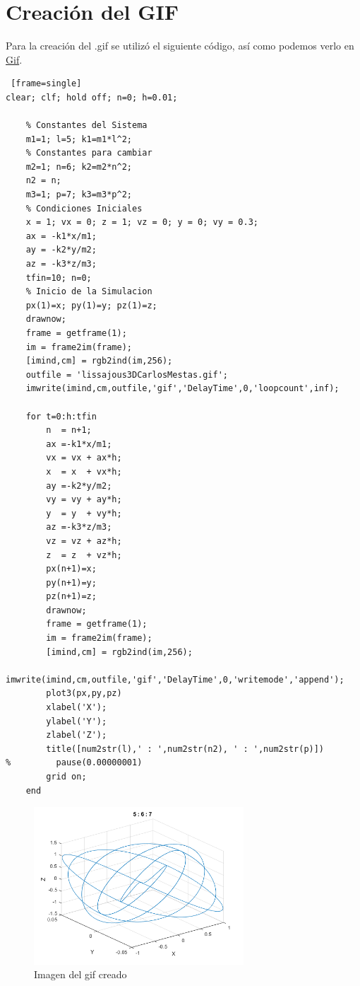 \documentclass{article}
\begin{document}
\clearpage
\newpage

\section{Creación del GIF}

Para la creación del .gif se utilizó el siguiente código, así como podemos verlo en \textcolor{blue}{
    \href{https://drive.google.com/file/d/18ty9yVBC-cS93bjtITK4pBOQUVgsb4mP/view?usp=sharing}{Gif}}.

\begin{lstlisting} [frame=single]
clear; clf; hold off; n=0; h=0.01;

    % Constantes del Sistema
    m1=1; l=5; k1=m1*l^2;
    % Constantes para cambiar
    m2=1; n=6; k2=m2*n^2;
    n2 = n;
    m3=1; p=7; k3=m3*p^2;
    % Condiciones Iniciales
    x = 1; vx = 0; z = 1; vz = 0; y = 0; vy = 0.3;
    ax = -k1*x/m1;  
    ay = -k2*y/m2; 
    az = -k3*z/m3; 
    tfin=10; n=0;
    % Inicio de la Simulacion
    px(1)=x; py(1)=y; pz(1)=z;
    drawnow;
    frame = getframe(1);
    im = frame2im(frame);        
    [imind,cm] = rgb2ind(im,256);       
    outfile = 'lissajous3DCarlosMestas.gif';
    imwrite(imind,cm,outfile,'gif','DelayTime',0,'loopcount',inf);      

    for t=0:h:tfin
        n  = n+1;
        ax =-k1*x/m1;
        vx = vx + ax*h;
        x  = x  + vx*h;
        ay =-k2*y/m2;
        vy = vy + ay*h;
        y  = y  + vy*h;
        az =-k3*z/m3;
        vz = vz + az*h;
        z  = z  + vz*h;
        px(n+1)=x;
        py(n+1)=y;
        pz(n+1)=z;  
        drawnow;
        frame = getframe(1);
        im = frame2im(frame);        
        [imind,cm] = rgb2ind(im,256);       
        imwrite(imind,cm,outfile,'gif','DelayTime',0,'writemode','append');
        plot3(px,py,pz)
        xlabel('X');
        ylabel('Y');
        zlabel('Z');
        title([num2str(l),' : ',num2str(n2), ' : ',num2str(p)])
%         pause(0.00000001)
        grid on;  
    end
\end{lstlisting}

\begin{figure}[H]
\centering
    \includegraphics[width=0.7\textwidth]{images/gif3DImage1.png}
    \caption{Imagen del gif creado}
\end{figure}
\end{document}
